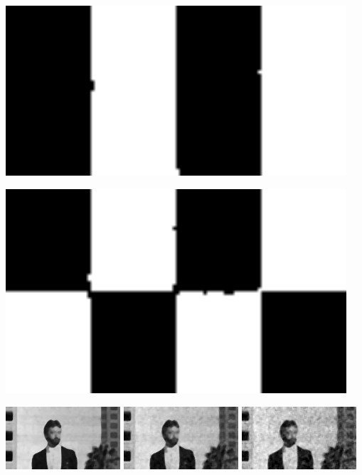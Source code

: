 \documentclass[a4paper,11pt, final]{scrartcl}
\begin{document}
\begin{minipage}{0.5\textwidth}
{
\centering 
\includegraphics[width=0.95\textwidth]{ex2_stripes_median_filter.png}
}  
\end{minipage}
\begin{minipage}{0.5\textwidth}
{
\centering 
\includegraphics[width=0.95\textwidth]{ex2_checker_median_filter.png}
}  
\end{minipage}

\vspace{1cm}
{
\centering 
\includegraphics[width=0.32\textwidth]{ex2_image_median_filter_less_noise.png}
\includegraphics[width=0.32\textwidth]{ex2_image_median_filter.png}
\includegraphics[width=0.32\textwidth]{ex2_image_median_filter_more_noise.png}
}
\end{document}
